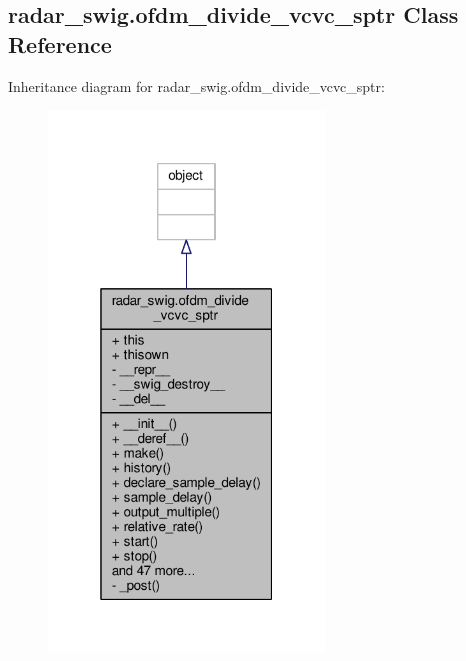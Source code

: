 \subsection{radar\+\_\+swig.\+ofdm\+\_\+divide\+\_\+vcvc\+\_\+sptr Class Reference}
\label{classradar__swig_1_1ofdm__divide__vcvc__sptr}


Inheritance diagram for radar\+\_\+swig.\+ofdm\+\_\+divide\+\_\+vcvc\+\_\+sptr\+:
\nopagebreak
\begin{figure}[H]
\begin{center}
\leavevmode
\includegraphics[width=208pt]{d8/d35/classradar__swig_1_1ofdm__divide__vcvc__sptr__inherit__graph}
\end{center}
\end{figure}


